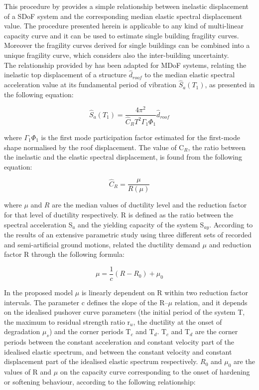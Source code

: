 This procedure by \citep{DolsekFajfar2004} provides a simple relationship between inelastic displacement of a SDoF system and the corresponding median elastic spectral displacement value. The procedure presented herein is applicable to any kind of multi-linear capacity curve and it can be used to estimate single building fragility curves. Moreover the fragility curves derived for single buildings can be combined into a unique fragility curve, which considers also the inter-building uncertainty.\\

The relationship provided by \citep{DolsekFajfar2004} has been adapted for MDoF systems, relating the inelastic top displacement of a structure $\hat{d}_{roof}$ to the median elastic spectral acceleration value at its fundamental period of vibration $\hat{S}_{a}(T_1)$, as presented in the following equation:

\begin{equation}
\hat{S}_a(T_1) = \frac{4 \pi^2}{\hat{C}_R T^2 \Gamma_1 \Phi_1} \hat{d}_{roof}
\label{eq:basic_DF}
\end{equation}

where $\Gamma_1 \Phi_1$ is the first mode participation factor estimated for the first-mode shape normalised by the roof displacement. The value of C$_R$, the ratio between the inelastic and the elastic spectral displacement, is found from the following equation:

\begin{equation}
\hat{C}_{R} = \frac{\mu}{R(\mu)}
\label{eq:Cr_DF}
\end{equation}

where $\mu$ and $R$ are the median values of ductility level and the reduction factor for that level of ductility respectively. R is defined as the ratio between the spectral acceleration S$_a$ and the yielding capacity of the system S$_{ay}$.  According to the results of an extensive parametric study using three different sets of recorded and semi-artificial ground motions, \citep{DolsekFajfar2004} related the ductility demand $\mu$ and reduction factor R through the following formula:

\begin{equation}
\label{eq:mu_DF}
\mu = \frac{1}{c} (R-R_{0})+\mu_{0}
\end{equation}

In the proposed model $\mu$ is linearly dependent on R within two reduction factor intervals. The parameter c defines the slope of the R–$\mu$ relation, and it depends on the idealised pushover curve parameters (the initial period of the system T, the maximum to residual strength ratio r$_{u}$, the ductility at the onset of degradation $\mu_s$) and the corner periods T$_{c}$ and T$_{d}$. T$_{c}$ and T$_{d}$ are the corner periods between the constant acceleration and constant velocity part of the idealised elastic spectrum, and between the constant velocity and constant displacement part of the idealised elastic spectrum respectively. $R_{0}$ and $\mu_{0}$ are the values of R and $\mu$ on the capacity curve corresponding to the onset of hardening or softening behaviour, according to the following relationship:

